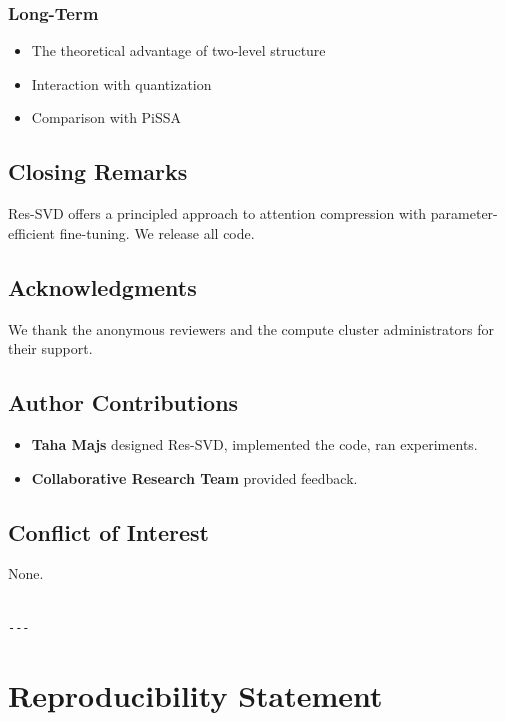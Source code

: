 \subsubsection{Long-Term}
\begin{itemize}
\item The theoretical advantage of two-level structure
\item Interaction with quantization
\item Comparison with PiSSA

\end{itemize}
\subsection{Closing Remarks}

Res-SVD offers a principled approach to attention compression with 
parameter-efficient fine-tuning. We release all code.

\subsection{Acknowledgments}

We thank the anonymous reviewers and the compute cluster administrators for their support.

\subsection{Author Contributions}

\begin{itemize}
\item \textbf{Taha Majs} designed Res-SVD, implemented the code, ran experiments.
\item \textbf{Collaborative Research Team} provided feedback.

\end{itemize}
\subsection{Conflict of Interest}

None.
\begin{lstlisting}

---
\end{lstlisting}

\section{Reproducibility Statement}

